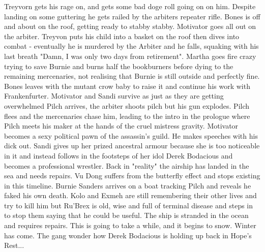 Treyvorn gets his rage on, and gets some bad doge roll going on on him. Despite landing on some guttering he gets railed by the arbiters repeater rifle.\medskip
Bones is off and about on the roof, getting ready to stabby stabby. Motivator goes all out on the arbiter.\medskip
Treyvon puts his child into a basket on the roof then dives into combat - eventually he is murdered by the Arbiter and he falls, squaking with his last breath "Damn, I was only two days from retirement".\medskip
Martha goes fire crazy trying to save Burnie and burns half the bookburners before dying to the remaining mercenaries, not realising that Burnie is still outside and perfectly fine.\medskip
Bones leaves with the mutant crow baby to raise it and continue his work with Frankenfurter.\medskip
Motivator and Sandi survive as just as they are getting overwhelmed Pilch arrives, the arbiter shoots pilch but his gun explodes. Pilch flees and the mercenaries chase him, leading to the intro in the prologue where Pilch meets his maker at the hands of the cruel mistress gravity.\medskip
Motivator becomes a sexy political pawn of the assassin's guild. He makes speeches with his dick out.\medskip
Sandi gives up her prized ancestral armour because she is too noticeable in it and instead follows in the footsteps of her idol Derek Bodacious and becomes a professional wrestler.\medskip
Back in "reality" the airship has landed in the sea and needs repairs. Vu Dong suffers from the butterfly effect and stops existing in this timeline. Burnie Sanders arrives on a boat tracking Pilch and reveals he faked his own death. Kolo and Exmeh are still remembering their other lives and try to kill him but Ru'Brex is old, wise and full of terminal disease and steps in to stop them saying that he could be useful.\medskip
The ship is stranded in the ocean and requires repairs. This is going to take a while, and it begins to snow. Winter has come. The gang wonder how Derek Bodacious is holding up back in Hope's Rest...